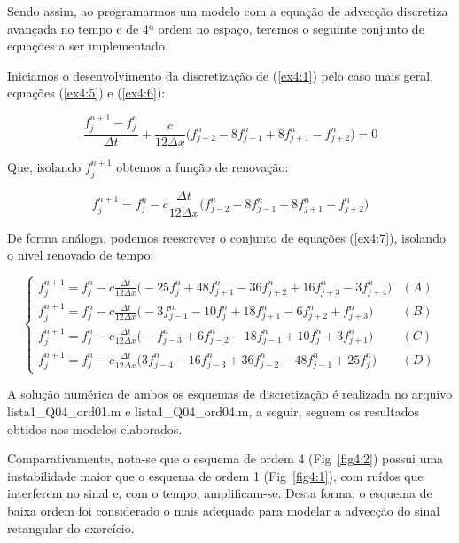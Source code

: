 \documentclass[11pt]{article}
\begin{document}
Sendo assim, ao programarmos um modelo com a equação de advecção
discretiza avançada no tempo e de 4ª ordem no espaço, teremos o seguinte
conjunto de equações a ser implementado.

Iniciamos o desenvolvimento da discretização de (\ref{ex4:1}) pelo caso
mais geral, equações (\ref{ex4:5}) e (\ref{ex4:6}):

\begin{equation}
    \frac{f^{n+1}_{j} - f^{n}_{j}}{\Delta{t}} + \frac{c}{12\Delta{x}}\biggl( f^{n}_{j-2} - 8f^{n}_{j-1} + 8f^{n}_{j+1} - f^{n}_{j+2} \bigg) = 0
    \label{ex4:8}
\end{equation}

Que, isolando \(f^{n+1}_{j}\) obtemos a função de renovação:

\begin{equation}
    f^{n+1}_{j} = f^{n}_{j}-c\frac{\Delta{t}}{12\Delta{x}}\biggl( f^{n}_{j-2} - 8f^{n}_{j-1} + 8f^{n}_{j+1} - f^{n}_{j+2} \bigg)
    \label{ex4:9}
\end{equation}

De forma análoga, podemos reescrever o conjunto de equações
(\ref{ex4:7}), isolando o nível renovado de tempo:

\begin{equation}
    \begin{cases}
            f^{n+1}_{j} = f^{n}_{j}-c\frac{\Delta{t}}{12\Delta{x}}\biggl( - 25f^{n}_{j} + 48f^{n}_{j+1} - 36f^{n}_{j+2} + 16f^{n}_{j+3} - 3f^{n}_{j+4} \bigg) & (A) \\
            f^{n+1}_{j} = f^{n}_{j}-c\frac{\Delta{t}}{12\Delta{x}}\biggl( - 3f^{n}_{j-1} - 10f^{n}_{j} + 18f^{n}_{j+1} - 6f^{n}_{j+2} + f^{n}_{j+3}  \bigg) & (B) \\
            f^{n+1}_{j} = f^{n}_{j}-c\frac{\Delta{t}}{12\Delta{x}}\biggl( - f^{n}_{j-3} + 6f^{n}_{j-2} - 18f^{n}_{j-1} + 10f^{n}_{j} + 3f^{n}_{j+1} \bigg) & (C) \\
            f^{n+1}_{j} = f^{n}_{j}-c\frac{\Delta{t}}{12\Delta{x}}\biggl( 3f^{n}_{j-4} - 16f^{n}_{j-3} + 36f^{n}_{j-2} - 48f^{n}_{j-1} + 25f^{n}_{j} \bigg) & (D)
            \label{ex4:10}
    \end{cases}
\end{equation}

A solução numérica de ambos os esquemas de discretização é realizada no
arquivo lista1\_Q04\_ord01.m e lista1\_Q04\_ord04.m, a seguir, seguem os
resultados obtidos nos modelos elaborados.

Comparativamente, nota-se que o esquema de ordem 4 (Fig~\ref{fig4:2}) possui uma
instabilidade maior que o esquema de ordem 1 (Fig~\ref{fig4:1}), com ruídos que
interferem no sinal e, com o tempo, amplificam-se. Desta forma, o
esquema de baixa ordem foi considerado o mais adequado para modelar a
advecção do sinal retangular do exercício.
\end{document}
